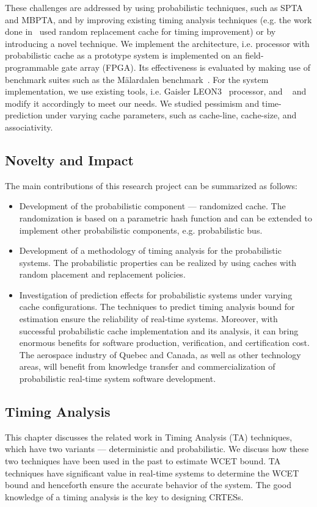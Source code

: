 These challenges are addressed by using probabilistic techniques, such as SPTA and MBPTA, and by improving existing timing analysis techniques (e.g. the work done in~\cite{Altmeyer:2015:SPT:2726097.2726149} used random replacement cache for timing improvement) or by introducing a novel technique. We implement the  architecture, i.e. processor with probabilistic cache as a prototype system  is implemented on an field-programmable gate array (FPGA). 
Its effectiveness is evaluated by making use of  benchmark suites such as the M{\"a}lardalen benchmark~\cite{mrtc:bench}. 
For the system implementation, we use existing tools, i.e.  Gaisler LEON3~\cite{leon3} processor, and ~\cite{ION} and modify it accordingly to meet our needs. We studied pessimism and time- prediction under varying  cache parameters, such as cache-line, cache-size, and associativity.

\subsection{Novelty and Impact}
The main contributions of this research project can be summarized as follows:

\begin{itemize}

\item{Development of  the probabilistic component --- randomized cache.  The randomization is based on a parametric hash function and can be extended to implement other probabilistic components, e.g. probabilistic bus}.
\item{Development of a methodology of timing analysis for the probabilistic systems. The probabilistic properties can be realized by using caches with random placement and replacement policies}.
\item{Investigation of prediction effects for probabilistic systems under varying cache configurations. The techniques to predict timing analysis bound for estimation ensure the reliability of real-time systems.
Moreover, with successful probabilistic cache implementation and its analysis, it can bring enormous benefits for software production, verification, and certification cost. The aerospace industry of Quebec and Canada, as well as other technology areas, will benefit from knowledge transfer and commercialization of probabilistic real-time system software development}.
\end{itemize}

\subsection{Timing Analysis}
\label{sec:1}
This chapter discusses the related work in Timing Analysis (TA) techniques, which have two variants --- deterministic and probabilistic. We discuss how these two techniques have been used in the past to estimate WCET bound. TA techniques have significant value in real-time systems to determine the WCET bound and henceforth ensure the accurate behavior of the system. The good knowledge of a timing analysis is the key to designing CRTESs.

